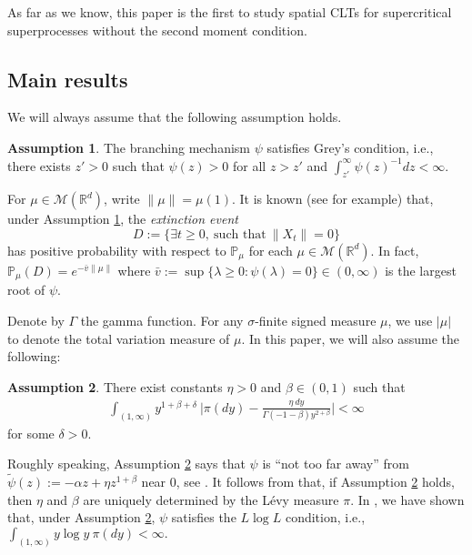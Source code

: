 \documentclass[12pt,a4paper]{amsart}
\theoremstyle{plain}
\theoremstyle{definition}
\newtheorem{asp}{Assumption}
\numberwithin{equation}{section}
\begin{document}
As far as we know, this paper is the first to study spatial CLTs for supercritical superprocesses without the second moment condition.

\subsection{Main results}
\label{sec:I:R}
We will always assume that the following assumption holds.
\begin{asp}
  \label{asp: Greys condition}
  The branching mechanism $\psi$ satisfies Grey's condition, i.e., there exists $z' > 0$ such that $\psi(z) > 0$ for all $z>z'$ and  $\int_{z'}^\infty \psi(z)^{-1}dz < \infty$.
\end{asp}
For $\mu \in \mathcal M(\mathbb R^d)$, write $\|\mu\| = \mu(1)$.
It is known (see \cite[Theorems 12.5 \& 12.7]{Kyprianou2014Fluctuations} for example) that, under Assumption \ref{asp: Greys condition}, the \emph{extinction event}
$$D :=\{\exists t\geq 0,~\text{such that}~ \|X_t\| =0 \}$$
has positive probability with respect to $\mathbb P_\mu$ for each  $\mu \in \mathcal M(\mathbb R^d)$.
In fact, $ \mathbb{P}_{\mu} (D) = e^{-\bar v \|\mu\|}$ where $ \bar v := \sup\{\lambda \geq 0: \psi(\lambda) = 0\} \in (0,\infty) $ is the largest root of $\psi$.

Denote by $\Gamma$ the gamma function.
For any $\sigma$-finite signed measure $\mu$, we use $|\mu|$ to denote the total variation measure of $\mu$.
In this paper, we will also assume the following:
\begin{asp}
  \label{asp: branching mechanism}
  There exist constants $\eta > 0$ and $\beta \in (0,1)$ such that
  \begin{align}
    \label{eq: asp of branching mechanism}
    \int_{(1,\infty)}y^{1+\beta +\delta}~\Big|\pi(dy)-\frac{\eta~dy}{\Gamma(-1-\beta)y^{2+\beta}}\Big| <\infty
  \end{align}
	for some $\delta > 0$.
\end{asp}

Roughly speaking, Assumption \ref{asp: branching mechanism} says that $\psi$ is ``not too far away'' from $\widetilde \psi(z) := - \alpha z + \eta z^{1+\beta}$ near $0$, see \cite[Remark 1.3]{RenSongSunZhao2019Stable}.
It follows from \cite[Lemma 2.2]{RenSongSunZhao2019Stable}  that, if Assumption \ref{asp: branching mechanism} holds, then $\eta$ and $\beta$ are uniquely determined by the L\'evy measure $\pi$.
In \cite[Lemma 2.3]{RenSongSunZhao2019Stable}, we have shown  that,
under Assumption \ref{asp: branching mechanism},
 $\psi$ satisfies the $L \log L$ condition, i.e., $ \int_{(1,\infty)} y\log y~\pi(dy) < \infty. $
\end{document}

